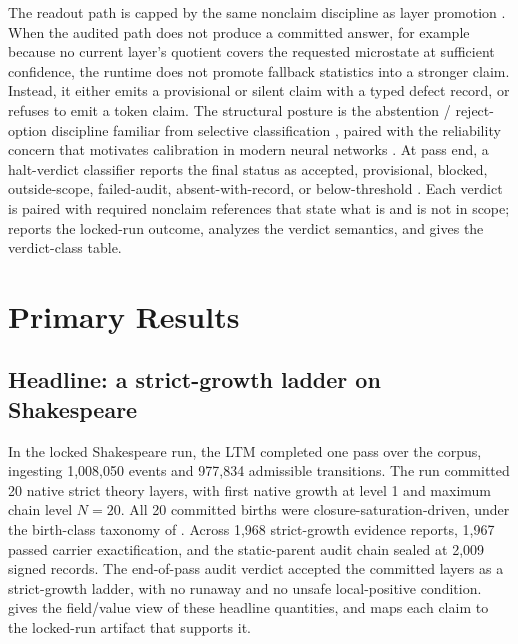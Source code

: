 \documentclass{article}
\theoremstyle{definition}
\begin{document}
The readout path is capped by the same nonclaim discipline as layer promotion \cite{Tsiokos2026FoundationsII}. When the audited path does not produce a committed answer, for example because no current layer's quotient covers the requested microstate at sufficient confidence, the runtime does not promote fallback statistics into a stronger claim. Instead, it either emits a provisional or silent claim with a typed defect record, or refuses to emit a token claim. The structural posture is the abstention / reject-option discipline familiar from selective classification \cite{Chow1970Reject,ElYanivWiener2010Selective}, paired with the reliability concern that motivates calibration in modern neural networks \cite{Guo2017Calibration}. At pass end, a halt-verdict classifier reports the final status as accepted, provisional, blocked, outside-scope, failed-audit, absent-with-record, or below-threshold \cite{Tsiokos2026FoundationsIII}. Each verdict is paired with required nonclaim references that state what is and is not in scope;  reports the locked-run outcome,  analyzes the verdict semantics, and  gives the verdict-class table.
 \section{Primary Results}\label{sec:primary-results}

\subsection{Headline: a strict-growth ladder on Shakespeare}\label{subsec:headline}

In the locked Shakespeare run, the LTM completed one pass over the corpus, ingesting 1,008,050 events and 977,834 admissible transitions. The run committed 20 native strict theory layers, with first native growth at level 1 and maximum chain level \(N=20\). All 20 committed births were closure-saturation-driven, under the birth-class taxonomy of . Across 1,968 strict-growth evidence reports, 1,967 passed carrier exactification, and the static-parent audit chain sealed at 2,009 signed records. The end-of-pass audit verdict accepted the committed layers as a strict-growth ladder, with no runaway and no unsafe local-positive condition.  gives the field/value view of these headline quantities, and  maps each claim to the locked-run artifact that supports it.
\end{document}
